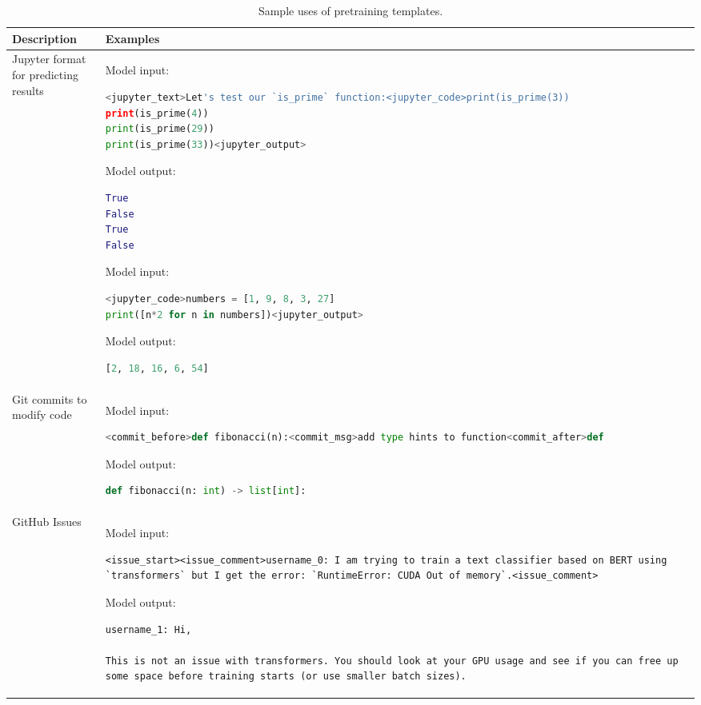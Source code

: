 \documentclass[10pt]{article} %
\begin{document}
\begin{table}[ht]
    \centering
    \begin{tabular}{p{2cm}|p{10cm}}%
    \toprule \textbf{Description} &  \textbf{Examples} \\
    \midrule
Jupyter format for predicting results & Model input:
\begin{lstlisting}[language=python]
<jupyter_text>Let's test our `is_prime` function:<jupyter_code>print(is_prime(3))
print(is_prime(4))
print(is_prime(29))
print(is_prime(33))<jupyter_output>
\end{lstlisting}
Model output:
\begin{lstlisting}[language=python]
True
False
True
False
\end{lstlisting}

Model input:
\begin{lstlisting}[language=python]
<jupyter_code>numbers = [1, 9, 8, 3, 27]
print([n*2 for n in numbers])<jupyter_output>
\end{lstlisting}
Model output:
\begin{lstlisting}[language=python]
[2, 18, 16, 6, 54]
\end{lstlisting}

\\
\midrule
Git commits to modify code & Model input:
\begin{lstlisting}[language=python]
<commit_before>def fibonacci(n):<commit_msg>add type hints to function<commit_after>def
\end{lstlisting}
Model output:
\begin{lstlisting}[language=python]
def fibonacci(n: int) -> list[int]:
\end{lstlisting}
\\
\midrule
GitHub Issues & Model input:
\begin{lstlisting}
<issue_start><issue_comment>username_0: I am trying to train a text classifier based on BERT using `transformers` but I get the error: `RuntimeError: CUDA Out of memory`.<issue_comment>
\end{lstlisting}
Model output:
\begin{lstlisting}
username_1: Hi,

This is not an issue with transformers. You should look at your GPU usage and see if you can free up some space before training starts (or use smaller batch sizes).
\end{lstlisting}
\\
    \bottomrule
    \end{tabular}
    \caption{Sample uses of pretraining templates.}
    \label{tab:tempgen}
\end{table}
\end{document}

